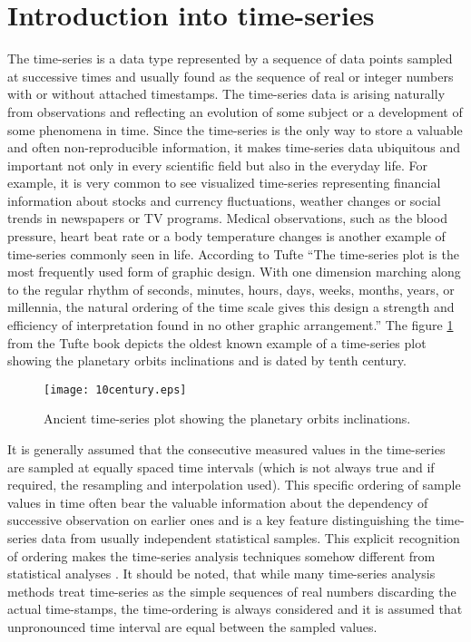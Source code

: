 \section{Introduction into time-series}
The time-series is a data type represented by a sequence of data points sampled at successive times and usually found as the sequence of real or integer numbers with or without attached timestamps. The time-series data is arising naturally from observations and reflecting an evolution of some subject or a development of some phenomena in time. Since the time-series is the only way to store a valuable and often non-reproducible information, it makes time-series data ubiquitous and important not only in every scientific field but also in the everyday life. For example, it is very common to see visualized time-series representing financial information about stocks and currency fluctuations, weather changes or social trends in newspapers or TV programs. Medical observations, such as the blood pressure, heart beat rate or a body temperature changes is another example of time-series commonly seen in life. According to Tufte \cite{citeulike:1454223} ``The time-series plot is the most frequently used form of graphic design. With one dimension marching along to the regular rhythm of seconds, minutes, hours, days, weeks, months, years, or millennia, the natural ordering of the time scale gives this design a strength and efficiency of interpretation found in no other graphic arrangement.'' The figure \ref{fig:10century} from the Tufte book depicts the oldest known example of a time-series plot showing the planetary orbits inclinations and is dated by tenth century.
\begin{figure}[tbp]
   \centering
   \texttt{[image: 10century.eps]}
   \caption{Ancient time-series plot showing the planetary orbits inclinations.}
   \label{fig:10century}
\end{figure} 

It is generally assumed that the consecutive measured values in the time-series are sampled at equally spaced time intervals (which is not always true and if required, the resampling and interpolation used). This specific ordering of sample values in time often bear the valuable information about the dependency of successive observation on earlier ones and is a key feature distinguishing the time-series data from usually independent statistical samples. 
This explicit recognition of ordering makes the time-series analysis techniques somehow different from statistical analyses \cite{citeulike:3989988}. It should be noted, that while many time-series analysis methods treat time-series as the simple sequences of real numbers discarding the actual time-stamps, the time-ordering is always considered and it is assumed that unpronounced time interval are equal between the sampled values.

